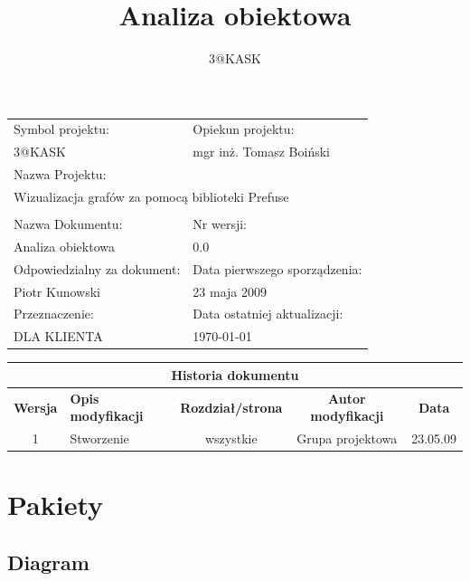 \documentclass[a4paper,10pt]{article}
\title{Analiza obiektowa}
\author{3@KASK}
\begin{document}



\maketitle


\begin{center}
\begin{longtable}{|p{7cm}|p{7cm}|}
\hline
Symbol projektu: & Opiekun projektu:   \tabularnewline 
3@KASK & mgr inż. Tomasz Boiński    \tabularnewline \hline
\multicolumn{2}{|l|}{Nazwa Projektu: } \tabularnewline
\multicolumn{2}{|l|}{Wizualizacja grafów za pomocą biblioteki Prefuse } \tabularnewline 
\hline
\multicolumn{2}{l}{ } \tabularnewline %
\hline 
Nazwa Dokumentu: & Nr wersji:   \tabularnewline 
Analiza obiektowa & 0.0 \tabularnewline \hline
Odpowiedzialny za dokument: & Data pierwszego sporządzenia:   \tabularnewline 
Piotr Kunowski & 23 maja 2009 \tabularnewline \hline
Przeznaczenie: & Data ostatniej aktualizacji:   \tabularnewline 
DLA KLIENTA & \today \tabularnewline \hline
\end{longtable}
\end{center}


\begin{center}
\begin{longtable}{|c|p{4cm}|c|c|c|}
\multicolumn{5}{c}{\textbf{Historia dokumentu}} \tabularnewline \hline
\textbf{Wersja} & \textbf{Opis modyfikacji} & \textbf{Rozdział/strona} & \textbf{Autor modyfikacji} & \textbf{Data} \tabularnewline \hline 
1 & Stworzenie & wszystkie & Grupa projektowa & 23.05.09 \tabularnewline \hline

\end{longtable}
\end{center}


\newpage
\tableofcontents
\newpage

\section{Pakiety}

\subsection{Diagram}
\end{document}
